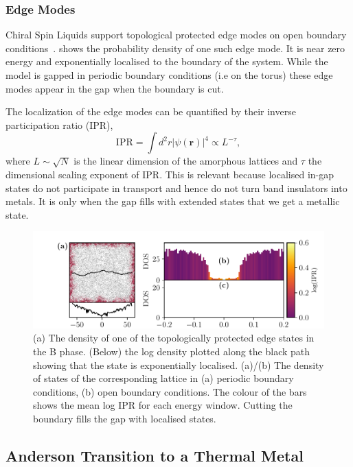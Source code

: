 \hypertarget{edge-modes}{%
\subsubsection{Edge Modes}\label{edge-modes}}

Chiral Spin Liquids support topological protected edge modes on open boundary conditions~\autocite{qi_general_2006}.  shows the probability density of one such edge mode. It is near zero energy and exponentially localised to the boundary of the system. While the model is gapped in periodic boundary conditions (i.e on the torus) these edge modes appear in the gap when the boundary is cut.

The localization of the edge modes can be quantified by their inverse participation ratio (IPR), \[\mathrm{IPR} = \int d^2r|\psi(\mathbf{r})|^4  \propto L^{-\tau},\] where \(L\sim\sqrt{N}\) is the linear dimension of the amorphous lattices and \(\tau\) the dimensional scaling exponent of IPR. This is relevant because localised in-gap states do not participate in transport and hence do not turn band insulators into metals. It is only when the gap fills with extended states that we get a metallic state.

\hypertarget{fig:edge_modes}{%
\begin{figure}
\centering
\includegraphics[width=1\textwidth,height=\textheight]{figure_code/amk_chapter/results/edge_modes/edge_modes}
\caption[{Edges States and Density of States}]{(a) The density of one of the topologically protected edge states in the B phase. (Below) the log density plotted along the black path showing that the state is exponentially localised. (a)/(b) The density of states of the corresponding lattice in (a) periodic boundary conditions, (b) open boundary conditions. The colour of the bars shows the mean log IPR for each energy window. Cutting the boundary fills the gap with localised states.}
\label{fig:edge_modes}
\end{figure}
}

\hypertarget{anderson-transition-to-a-thermal-metal}{%
\subsection{Anderson Transition to a Thermal Metal}\label{anderson-transition-to-a-thermal-metal}}

